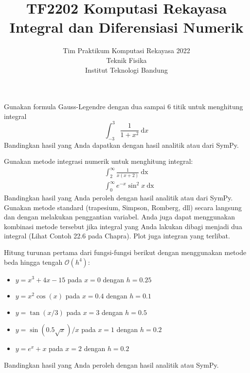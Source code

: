 



\title{%
{\small TF2202 Komputasi Rekayasa}\\
Integral dan Diferensiasi Numerik
}
\author{Tim Praktikum Komputasi Rekayasa 2022\\
Teknik Fisika\\
Institut Teknologi Bandung}
\date{}
\maketitle











\begin{soal}
Gunakan formula Gauss-Legendre dengan dua sampai 6 titik untuk menghitung integral
\begin{equation}
\int_{-3}^{3} \frac{1}{1 + x^2}\ \mathrm{d}x
\end{equation}
Bandingkan hasil yang Anda dapatkan dengan hasil analitik atau dari SymPy.
\end{soal}

\begin{soal}
Gunakan metode integrasi numerik untuk menghitung integral:
\begin{align}
& \int_{2}^{\infty} \frac{1}{x(x + 2)}\ \mathrm{dx} \\
& \int_{0}^{\infty} e^{-x} \sin^{2} x\ \mathrm{dx}
\end{align}
Bandingkan hasil yang Anda peroleh dengan hasil analitik atau dari SymPy.
Gunakan metode standard (trapesium, Simpson, Romberg, dll) secara
langsung dan dengan melakukan penggantian variabel. Anda juga dapat menggunakan
kombinasi metode tersebut jika integral yang Anda lakukan dibagi menjadi dua
integral (Lihat Contoh 22.6 pada Chapra). Plot juga integran yang terlibat.
\end{soal}


\begin{soal}
Hitung turunan pertama dari fungsi-fungsi berikut dengan menggunakan metode beda hingga
tengah $\mathcal{O}(h^4)$:
\begin{itemize}
\item $y = x^3 + 4x - 15$ pada $x=0$ dengan $h=0.25$
\item $y = x^2 \cos(x)$ pada $x=0.4$ dengan $h=0.1$
\item $y = \tan(x/3)$ pada $x=3$ dengan $h=0.5$
\item $y = \sin(0.5\sqrt{x})/x$ pada $x=1$ dengan $h=0.2$
\item $y = e^{x} + x$ pada $x=2$ dengan $h=0.2$
\end{itemize}
Bandingkan hasil yang Anda peroleh dengan hasil analitik atau SymPy.
\end{soal}



